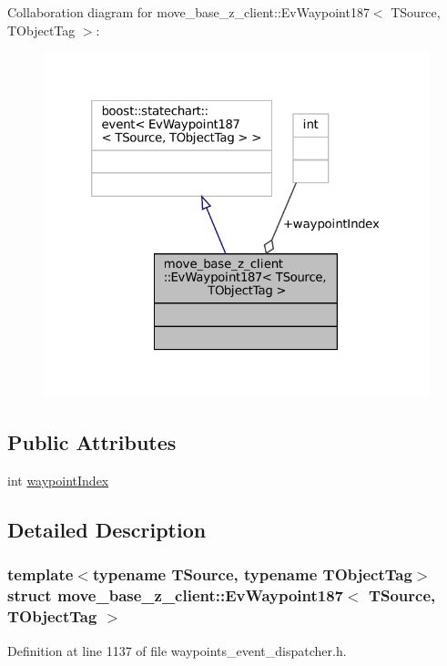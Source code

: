Collaboration diagram for move\+\_\+base\+\_\+z\+\_\+client\+:\+:Ev\+Waypoint187$<$ T\+Source, T\+Object\+Tag $>$\+:
\nopagebreak
\begin{figure}[H]
\begin{center}
\leavevmode
\includegraphics[width=320pt]{structmove__base__z__client_1_1EvWaypoint187__coll__graph}
\end{center}
\end{figure}
\subsection*{Public Attributes}
\begin{DoxyCompactItemize}
\item 
int \hyperlink{structmove__base__z__client_1_1EvWaypoint187_a122d54e82e47ee30b056ffa30551b14b}{waypoint\+Index}
\end{DoxyCompactItemize}


\subsection{Detailed Description}
\subsubsection*{template$<$typename T\+Source, typename T\+Object\+Tag$>$\newline
struct move\+\_\+base\+\_\+z\+\_\+client\+::\+Ev\+Waypoint187$<$ T\+Source, T\+Object\+Tag $>$}



Definition at line 1137 of file waypoints\+\_\+event\+\_\+dispatcher.\+h.



